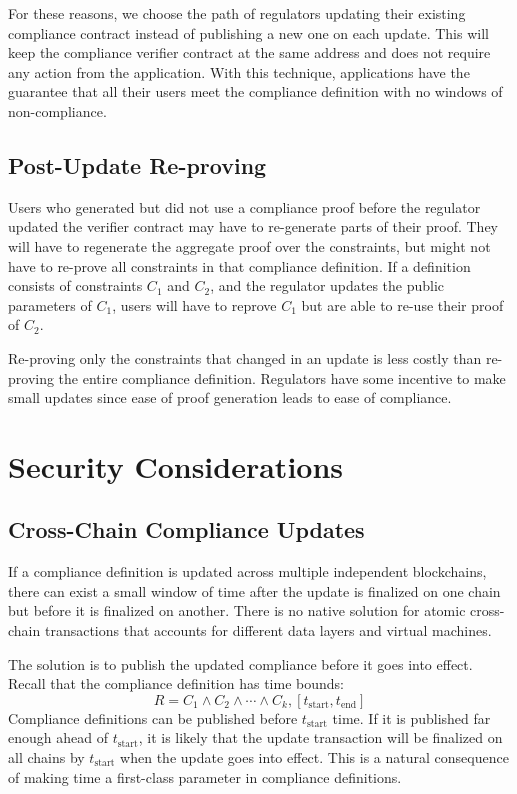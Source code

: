 \documentclass[9pt]{extreport}
\begin{document}
For these reasons, we choose the path of regulators updating their existing compliance contract instead of publishing a new one on each update.  This will keep the compliance verifier contract at the same address and does not require any action from the application.  With this technique, applications have the guarantee that all their users meet the compliance definition with no windows of non-compliance.

\subsection{Post-Update Re-proving}

Users who generated but did not use a compliance proof before the regulator updated the verifier contract may have to re-generate parts of their proof.  They will have to regenerate the aggregate proof over the constraints, but might not have to re-prove all constraints in that compliance definition.  If a definition consists of constraints $C_1$ and $C_2$, and the regulator updates the public parameters of $C_1$, users will have to reprove $C_1$ but are able to re-use their proof of $C_2$.

Re-proving only the constraints that changed in an update is less costly than re-proving the entire compliance definition.  Regulators have some incentive to make small updates since ease of proof generation leads to ease of compliance.

\section{Security Considerations}
\label{sec:security}

\subsection{Cross-Chain Compliance Updates}
If a compliance definition is updated across multiple independent blockchains, there can exist a small window of time after the update is finalized on one chain but before it is finalized on another.  There is no native solution for atomic cross-chain transactions that accounts for different data layers and virtual machines. 

The solution is to publish the updated compliance before it goes into effect.  Recall that the compliance definition has time bounds: $$R = C_1 \land C_2 \land \cdots \land C_k, [t_{\text{start}}, t_{\text{end}}]$$
Compliance definitions can be published before $t_\text{start}$ time.  If it is published far enough ahead of $t_\text{start}$, it is likely that the update transaction will be finalized on all chains by $t_\text{start}$ when the update goes into effect.  This is a natural consequence of making time a first-class parameter in compliance definitions.
\end{document}
